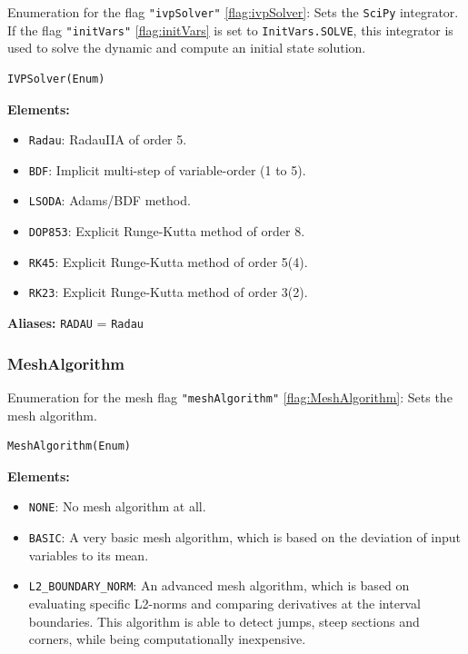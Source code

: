 \documentclass[12pt]{article}
\begin{document}
\begin{mdframed}[backgroundcolor=gray!10, roundcorner=10pt,
		linewidth=1pt]
	Enumeration for the flag \texttt{"ivpSolver"}
	\eqref{flag:ivpSolver}:
	Sets the \texttt{SciPy} integrator. If the flag
	\texttt{"initVars"} \eqref{flag:initVars} is set to
	\texttt{InitVars.SOLVE}, this
	integrator is used to solve the dynamic and compute an initial state
	solution.

	\begin{lstlisting}
IVPSolver(Enum)
		\end{lstlisting}
	\label{enum:IVPSolver}
	\textbf{Elements:}
	\begin{itemize}
		\item \texttt{Radau}: RadauIIA of order 5.
		\item \texttt{BDF}: Implicit multi-step of
		      variable-order (1 to 5).
		\item \texttt{LSODA}: Adams/BDF method.
		\item \texttt{DOP853}: Explicit Runge-Kutta method of
		      order 8.
		\item \texttt{RK45}: Explicit Runge-Kutta method of
		      order 5(4).
		\item \texttt{RK23}: Explicit Runge-Kutta method of
		      order 3(2).
	\end{itemize}

	\textbf{Aliases:} \texttt{RADAU} = \texttt{Radau}
\end{mdframed}

\subsubsection{MeshAlgorithm}

\begin{mdframed}[backgroundcolor=gray!10, roundcorner=10pt,
		linewidth=1pt]
	Enumeration for the mesh flag \texttt{"meshAlgorithm"}
	\eqref{flag:MeshAlgorithm}:
	Sets the mesh algorithm.

	\begin{lstlisting}
MeshAlgorithm(Enum)
		\end{lstlisting}
	\label{enum:MeshAlgorithm}
	\textbf{Elements:}
	\begin{itemize}
		\item \texttt{NONE}: No mesh algorithm at all.
		\item \texttt{BASIC}: A very basic mesh algorithm, which is
		      based on the deviation of input variables to its mean.
		\item \texttt{L2\_BOUNDARY\_NORM}: An advanced mesh algorithm,
		      which is based on evaluating specific L2-norms and
		      comparing derivatives at the
		      interval boundaries. This algorithm is able to detect
		      jumps, steep sections and
		      corners, while being
		      computationally inexpensive.
	\end{itemize}

\end{mdframed}
\end{document}
